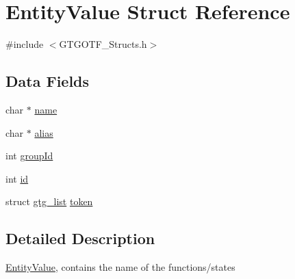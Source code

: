 \hypertarget{structEntityValue}{\section{Entity\-Value Struct Reference}
\label{structEntityValue}
}


{\ttfamily \#include $<$G\-T\-G\-O\-T\-F\-\_\-\-Structs.\-h$>$}

\subsection*{Data Fields}
\begin{DoxyCompactItemize}
\item 
char $\ast$ \hyperlink{structEntityValue_a5e6e1be50971e3c2547ab66657740c6e}{name}
\item 
char $\ast$ \hyperlink{structEntityValue_aa4ce16b0131ebd56e2fbf263f7007c1e}{alias}
\item 
int \hyperlink{structEntityValue_af9d0d2fd22efd3610ed6fddc23680388}{group\-Id}
\item 
int \hyperlink{structEntityValue_a61d28bb9506e9f63393b1125360daca1}{id}
\item 
struct \hyperlink{structgtg__list}{gtg\-\_\-list} \hyperlink{structEntityValue_a191ba3c755e7cc31ad8b8f2dc8e82303}{token}
\end{DoxyCompactItemize}


\subsection{Detailed Description}
\hyperlink{structEntityValue}{Entity\-Value}, contains the name of the functions/states 

